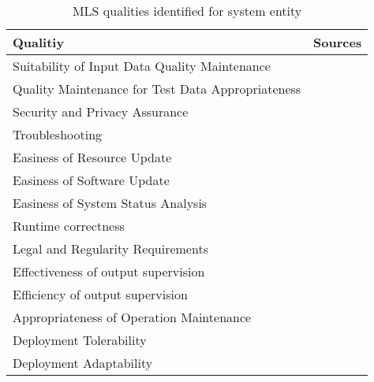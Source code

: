 \begin{table}[h]\label{tb:LiteratureQualitiesSystem}
    \centering\footnotesize
    \begin{tabular}{p{} p{}}
        \textbf{Qualitiy} & \textbf{Sources} \\
        \toprule
        Suitability of Input Data Quality Maintenance &~\cite{nakamichi_requirements-driven_2020} \\
        Quality Maintenance for Test Data Appropriateness&~\cite{nakamichi_requirements-driven_2020}\\
        Security and Privacy Assurance&~\cite{nakamichi_requirements-driven_2020,zhang_machine_2020}\\
        Troubleshooting &~\cite{arpteg_software_2018} \\
        Easiness of Resource Update &~\cite{nakamichi_requirements-driven_2020} \\
        Easiness of Software Update &~\cite{nakamichi_requirements-driven_2020} \\
        Easiness of System Status Analysis &~\cite{nakamichi_requirements-driven_2020} \\
        Runtime correctness &~\cite{siebert_construction_2021} \\
        Legal and Regularity Requirements &~\cite{vogelsang_requirements_2019} \\
        Effectiveness of output supervision &~\cite{siebert_construction_2021} \\
        Efficiency of output supervision &~\cite{siebert_construction_2021} \\
        Appropriateness of Operation Maintenance &~\cite{nakamichi_requirements-driven_2020} \\
        Deployment Tolerability &~\cite{ashmore_assuring_2021} \\
        Deployment Adaptability &~\cite{ashmore_assuring_2021} \\
    \end{tabular}
    \caption{MLS qualities identified for system entity}
\end{table}

